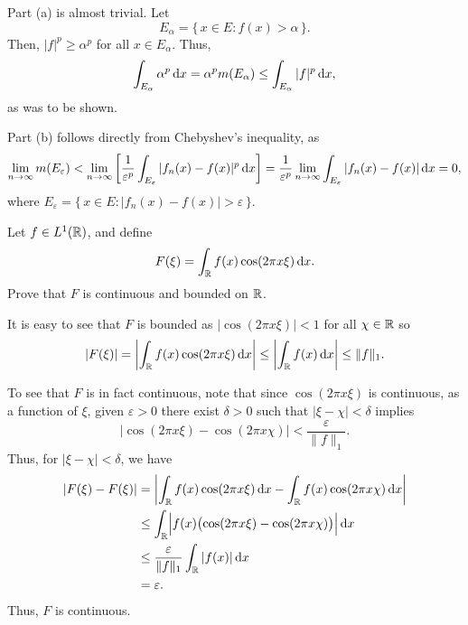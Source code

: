 \begin{solution}
  Part (a) is almost trivial. Let
  \[
    E_\alpha=\bigl\{\,x\in E:f(x)>\alpha\,\bigr\}.
  \]
  Then, \(|f|^p\geq \alpha^p\) for all \(x\in E_\alpha\). Thus,
  \[
    \int_{E_\alpha}\alpha^p\mathop{}\!\mathrm{d} x=\alpha^pm(E_\alpha)\leq\int_{E_\alpha}|f|^p\mathop{}\!\mathrm{d} x,
  \]
  as was to be shown.

  Part (b) follows directly from Chebyshev's inequality, as
  \[
    \lim_{n\to\infty}m(E_\varepsilon) <\lim_{n\to\infty}
    \left[\frac{1}{\varepsilon^p}\int_{E_\varepsilon}|f_n(x)-f(x)|^p\mathop{}\!\mathrm{d}
      x\right]=
    \frac{1}{\varepsilon^p}\lim_{n\to\infty}\int_{E_\varepsilon}|f_n(x)-f(x)|\mathop{}\!\mathrm{d}
    x=0,
  \]
  where \(E_\varepsilon=\bigl\{\,x\in
  E:|f_n(x)-f(x)|>\varepsilon\,\bigr\}\).
\end{solution}

\begin{problem}
  Let \(f\in L^1(\mathbb{R})\), and define
  \[
    F(\xi)=\int_{\mathbb{R}} f(x)\cos(2\pi x\xi)\mathop{}\!\mathrm{d} x.
  \]
  Prove that \(F\) is continuous and bounded on \(\mathbb{R}\).
\end{problem}
\begin{solution}
  It is easy to see that \(F\) is bounded as \(|{\cos(2\pi x\xi)}|<1\) for
  all \(\chi\in\mathbb{R}\) so
  \[
    |F(\xi)|= \left| \int_{\mathbb{R}} f(x)\cos(2\pi x\xi)\mathop{}\!\mathrm{d} x \right| \leq
    \left|\int_{\mathbb{R}} f(x)\mathop{}\!\mathrm{d} x\right|\leq \|f\|_1.
  \]

  To see that \(F\) is in fact continuous, note that since \(\cos(2\pi
  x\xi)\) is continuous, as a function of \(\xi\), given \(\varepsilon>0\)
  there exist \(\delta>0\) such that \(|\xi-\chi|<\delta\) implies
  \[
    |{\cos(2\pi x\xi)-\cos(2\pi x\chi)}|<\frac{\varepsilon}{\|f\|_1}.
  \]
  Thus, for \(|\xi-\chi|<\delta\), we have
  \begin{align*}
    |F(\xi)-F(\xi)|
    &=\left|
      \int_{\mathbb{R}} f(x)\cos(2\pi x\xi)\mathop{}\!\mathrm{d} x
      -\int_{\mathbb{R}} f(x)\cos(2\pi x\chi)\mathop{}\!\mathrm{d} x
      \right|\\
    &\leq
      \int_{\mathbb{R}}\Bigl|f(x)\bigl(\cos(2\pi x\xi)-\cos(2\pi x\chi)\bigr)\Bigr|\mathop{}\!\mathrm{d} x
    \\
    &\leq \frac{\varepsilon}{\|f\|_1}\int_{\mathbb{R}} |f(x)|\mathop{}\!\mathrm{d} x\\
    &=\varepsilon.
  \end{align*}
  Thus, \(F\) is continuous.
\end{solution}

